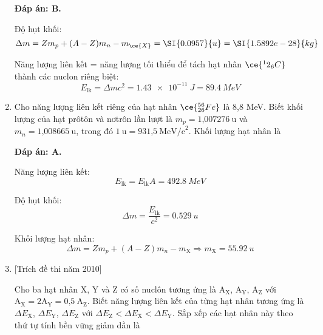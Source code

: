 \begin{enumerate}[label=\bfseries Câu \arabic*:]
	\loigiai
	{		\textbf{Đáp án: B.}
		
		Độ hụt khối:
		$$\Delta m = Z m_p + (A-Z)m_n - m_{\ce{X}} = \SI{0.0957}{u} = \SI{1.5892e-28}{kg}$$
		
		Năng lượng liên kết = năng lượng tối thiểu để tách hạt nhân $\ce{^12_6 C}$ thành các nuclon riêng biệt:
		$$E_{\text{lk}} = \Delta m c^2 = \SI{1.43e-11}{J} = \SI{89.4}{MeV}$$
		
	}
	
	\item {}
	\cauhoi
	{Cho năng lượng liên kết riêng của hạt nhân $\ce{^{56}_{26} Fe}$ là 8,8 MeV. Biết khối lượng của hạt prôtôn và nơtrôn lần lượt là $m_p = \text{1,007276}\ \text{u}$ và $m_n = \text{1,008665}\ \text{u}$, trong đó $1\ \text{u} = \text{931,5}\ \text{MeV/c}^2$. Khối lượng hạt nhân  là
	}
	
	\loigiai
	{		\textbf{Đáp án: A.}
		
		Năng lượng liên kết:
		$$E_{\text{lk}} = E_{\text{lk}} A = \SI{492.8}{MeV}$$
		
		Độ hụt khối:
		$$\Delta m = \dfrac{E_{\text{lk}}}{c^2} = \SI{0.529}{u}$$
		
		Khối lượng hạt nhân:
		$$\Delta m = Z m_p + (A-Z) m_n - m_{\text{X}} \Rightarrow m_{\text{X}} = \SI{55.92}{u}$$
		
	}
	
	
	\item {} [Trích đề thi năm 2010]
	\cauhoi
	{Cho ba hạt nhân X, Y và Z có số nuclôn tương ứng là $\text{A}_{\text{X}}$, $\text{A}_{\text{Y}}$, $\text{A}_{\text{Z}}$ với $\text{A}_{\text{X}} = 2\text{A}_{\text{Y}} = \text{0,5}\ \text{A}_{\text{Z}}$. Biết năng lượng liên kết của từng hạt nhân tương ứng là $\Delta E_{\text{X}}$, $\Delta E_{\text{Y}}$, $\Delta E_{\text{Z}}$ với $\Delta E_{\text{Z}} < \Delta E_{\text{X}} < \Delta E_{\text{Y}}$. Sắp xếp các hạt nhân này theo thứ tự tính bền vững giảm dần là
	}
	

\end{enumerate}
